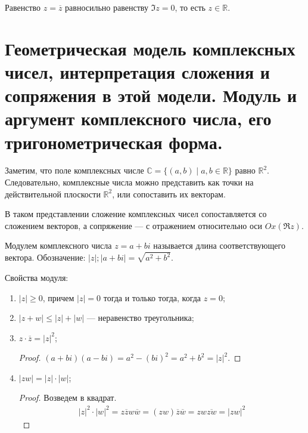 \begin{Comment}
Равенство $z = \overline{z}$ равносильно равенству $\Im z = 0$, то есть $z \in \mathbb{R}$.
\end{Comment}

\section{Геометрическая модель комплексных чисел, интерпретация сложения и сопряжения в этой модели. Модуль и аргумент комплексного числа, его тригонометрическая форма.}

Заметим, что поле комплексных числе $\mathbb{C} = \{(a, b) \mid a, b \in \mathbb{R}\}$ равно $\mathbb{R}^2$. Следовательно, комплексные числа можно представить как точки на действительной плоскости $\mathbb{R}^2$, или сопоставить их векторам.

\begin{center}
\end{center}

В таком представлении сложение комплексных чисел сопоставляется со сложением векторов, а сопряжение — с отражением относительно оси $Ox (\Re z)$.

\begin{Def}
Модулем комплексного числа $z = a + bi$ называется длина соответствующего вектора. Обозначение: $|z|; |a+bi| = \sqrt{a^2 + b^2}$.
\end{Def}

Свойства модуля:
\begin{enumerate}
\item $|z| \geqslant 0$, причем $|z| = 0$ тогда и только тогда, когда $z = 0$;
\item $|z + w| \leqslant |z| + |w|$ — неравенство треугольника;
\item $z\cdot\overline{z} = |z|^2$;
\begin{proof}
$(a + bi)(a - bi) = a^2 - (bi)^2 = a^2 + b^2 = |z|^2$.
\end{proof}
\item $|zw| = |z| \cdot |w|$;
\begin{proof}
Возведем в квадрат.
\begin{gather*}
|z|^2 \cdot |w|^2 = z \overline{z} w \overline{w} = (zw)\overline{z}\overline{w} = zw\overline{zw} = |zw|^2
\end{gather*}
\end{proof}
\end{enumerate}

